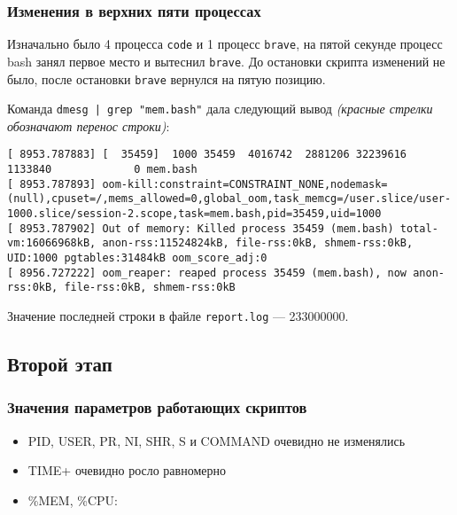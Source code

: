 \documentclass[10pt, a4paper]{article}
\begin{document}




\subsubsection*{Изменения в верхних пяти процессах}

Изначально было 4 процесса \texttt{code} и 1 процесс \texttt{brave}, на пятой секунде процесс bash занял первое место и вытеснил \texttt{brave}. До остановки скрипта изменений не было, после остановки \texttt{brave} вернулся на пятую позицию.

Команда \texttt{dmesg | grep "mem.bash"} дала следующий вывод \textit{(красные стрелки обозначают перенос строки)}:

\begin{lstlisting}
[ 8953.787883] [  35459]  1000 35459  4016742  2881206 32239616  1133840             0 mem.bash
[ 8953.787893] oom-kill:constraint=CONSTRAINT_NONE,nodemask=(null),cpuset=/,mems_allowed=0,global_oom,task_memcg=/user.slice/user-1000.slice/session-2.scope,task=mem.bash,pid=35459,uid=1000
[ 8953.787902] Out of memory: Killed process 35459 (mem.bash) total-vm:16066968kB, anon-rss:11524824kB, file-rss:0kB, shmem-rss:0kB, UID:1000 pgtables:31484kB oom_score_adj:0
[ 8956.727222] oom_reaper: reaped process 35459 (mem.bash), now anon-rss:0kB, file-rss:0kB, shmem-rss:0kB
\end{lstlisting}

Значение последней строки в файле \texttt{report.log} --- 233000000.

\subsection*{Второй этап}

\subsubsection*{Значения параметров работающих скриптов}

\begin{itemize}
    \item PID, USER, PR, NI, SHR, S и COMMAND очевидно не изменялись
    \item TIME+ очевидно росло равномерно
    \item \%MEM, \%CPU:
\end{itemize}
\end{document}
